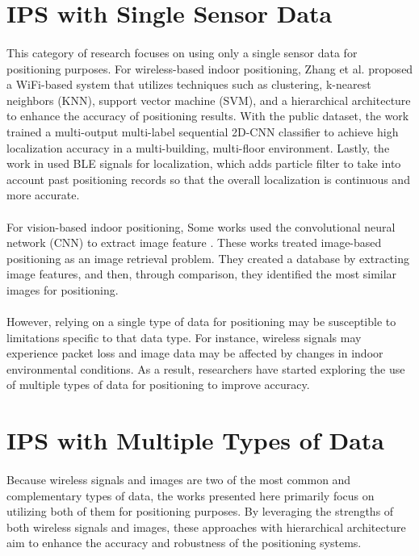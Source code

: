 \documentclass[a4paper,12pt]{report}
\begin{document}
\section{IPS with Single Sensor Data}
\paragraph{}
This category of research focuses on using only a single sensor data for positioning purposes. For wireless-based indoor positioning, Zhang et al. \cite{zhang2020received} proposed a WiFi-based system that utilizes techniques such as clustering, k-nearest neighbors (KNN), support vector machine (SVM), and a hierarchical architecture to enhance the accuracy of positioning results. With the public dataset, the work \cite{sonny2022fingerprint} trained a multi-output multi-label sequential 2D-CNN classifier to achieve high localization accuracy in a multi-building, multi-floor environment. Lastly, the work in \cite{Sou2019BTrack} used BLE signals for localization, which adds particle filter to take into account past positioning records so that the overall localization is continuous and more accurate.
\paragraph{}
For vision-based indoor positioning, Some works used the convolutional neural network (CNN) to extract image feature  \cite{chen2018indoor,gao2020lightweight}. These works treated image-based positioning as an image retrieval problem. They created a database by extracting image features, and then, through comparison, they identified the most similar images for positioning.
\paragraph{}
However, relying on a single type of data for positioning may be susceptible to limitations specific to that data type. For instance, wireless signals may experience packet loss and image data may be affected by changes in indoor environmental conditions. As a result, researchers have started exploring the use of multiple types of data for positioning to improve accuracy.
\section{IPS with Multiple Types of Data}
\paragraph{}
Because wireless signals and images are two of the most common and complementary types of data, the works presented here primarily focus on utilizing both of them for positioning purposes. By leveraging the strengths of both wireless signals and images, these approaches with hierarchical architecture aim to enhance the accuracy and robustness of the positioning systems.
\end{document}
